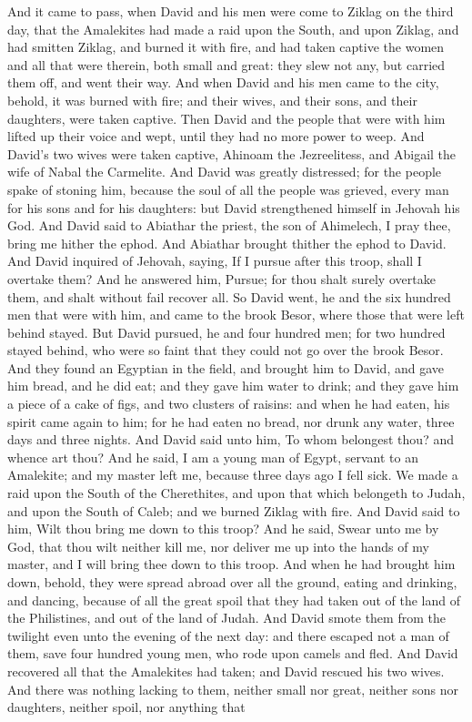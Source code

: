 And it came to pass, when David and his men were come to Ziklag on the third day, that the Amalekites had made a raid upon the South, and upon Ziklag, and had smitten Ziklag, and burned it with fire, and had taken captive the women and all that were therein, both small and great: they slew not any, but carried them off, and went their way. And when David and his men came to the city, behold, it was burned with fire; and their wives, and their sons, and their daughters, were taken captive. Then David and the people that were with him lifted up their voice and wept, until they had no more power to weep. And David’s two wives were taken captive, Ahinoam the Jezreelitess, and Abigail the wife of Nabal the Carmelite. And David was greatly distressed; for the people spake of stoning him, because the soul of all the people was grieved, every man for his sons and for his daughters: but David strengthened himself in Jehovah his God.  And David said to Abiathar the priest, the son of Ahimelech, I pray thee, bring me hither the ephod. And Abiathar brought thither the ephod to David. And David inquired of Jehovah, saying, If I pursue after this troop, shall I overtake them? And he answered him, Pursue; for thou shalt surely overtake them, and shalt without fail recover all. So David went, he and the six hundred men that were with him, and came to the brook Besor, where those that were left behind stayed. But David pursued, he and four hundred men; for two hundred stayed behind, who were so faint that they could not go over the brook Besor.  And they found an Egyptian in the field, and brought him to David, and gave him bread, and he did eat; and they gave him water to drink; and they gave him a piece of a cake of figs, and two clusters of raisins: and when he had eaten, his spirit came again to him; for he had eaten no bread, nor drunk any water, three days and three nights. And David said unto him, To whom belongest thou? and whence art thou? And he said, I am a young man of Egypt, servant to an Amalekite; and my master left me, because three days ago I fell sick. We made a raid upon the South of the Cherethites, and upon that which belongeth to Judah, and upon the South of Caleb; and we burned Ziklag with fire. And David said to him, Wilt thou bring me down to this troop? And he said, Swear unto me by God, that thou wilt neither kill me, nor deliver me up into the hands of my master, and I will bring thee down to this troop.  And when he had brought him down, behold, they were spread abroad over all the ground, eating and drinking, and dancing, because of all the great spoil that they had taken out of the land of the Philistines, and out of the land of Judah. And David smote them from the twilight even unto the evening of the next day: and there escaped not a man of them, save four hundred young men, who rode upon camels and fled. And David recovered all that the Amalekites had taken; and David rescued his two wives. And there was nothing lacking to them, neither small nor great, neither sons nor daughters, neither spoil, nor anything that 